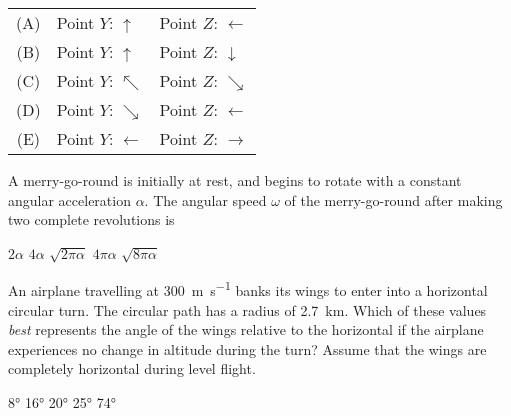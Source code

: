 \documentclass{../../oss-apphys-exam}
\begin{document}
\begin{multicols*}{2}
\begin{questions}
    \begin{tabular}{cll}
      (A) & Point $Y$: {\LARGE $\uparrow$} & Point $Z$: {\LARGE $\leftarrow$}\\
      (B) & Point $Y$: {\LARGE $\uparrow$} & Point $Z$: {\LARGE $\downarrow$}\\
      (C) & Point $Y$: {\LARGE $\nwarrow$} & Point $Z$: {\LARGE $\searrow$}\\
      (D) & Point $Y$: {\LARGE $\searrow$} & Point $Z$: {\LARGE $\leftarrow$}\\
      (E) & Point $Y$: {\LARGE $\leftarrow$}&Point $Z$: {\LARGE $\rightarrow$}\\
    \end{tabular}
    \columnbreak

    \question A merry-go-round is initially at rest, and begins to rotate with a
    constant angular acceleration $\alpha$. The angular speed $\omega$ of the
    merry-go-round after making two complete revolutions is
    \begin{choices}
      \choice $2\alpha$
      \choice $4\alpha$
      \choice $\sqrt{2\pi\alpha}$
      \choice $4\pi\alpha$
      \choice $\sqrt{8\pi\alpha}$
    \end{choices}

    \question An airplane travelling at \SI{300}{\metre\per\second} banks its
    wings to enter into a horizontal circular turn. The circular path has a
    radius of \SI{2.7}{\kilo\metre}. Which of these values \emph{best}
    represents the angle of the wings relative to the horizontal if the airplane
    experiences no change in altitude during the turn? Assume that the wings
    are completely horizontal during level flight.
    \begin{choices}
      \choice\ang{8}
      \choice\ang{16}
      \choice\ang{20}
      \choice\ang{25}
      \correctchoice\ang{74}
    \end{choices}
    
    

\end{questions}
\end{multicols*}
\end{document}
